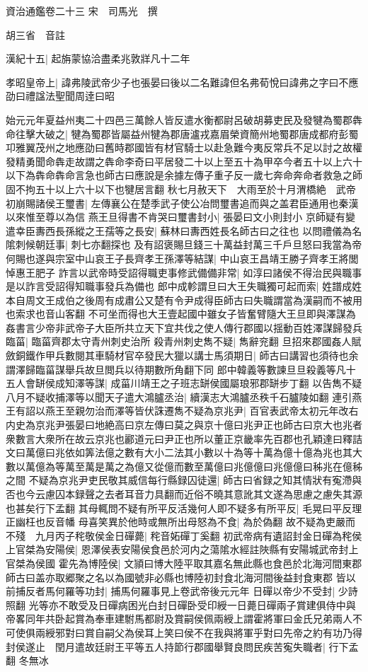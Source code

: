 資治通鑑卷二十三
宋　司馬光　撰

胡三省　音註

漢紀十五|{
	起旃蒙協洽盡柔兆敦牂凡十二年}


孝昭皇帝上|{
	諱弗陵武帝少子也張晏曰後以二名難諱但名弗荀悅曰諱弗之字曰不應劭曰禮諡法聖聞周逹曰昭}


始元元年夏益州夷二十四邑三萬餘人皆反遣水衡都尉呂破胡募吏民及發犍為蜀郡犇命往擊大破之|{
	犍為蜀郡皆屬益州犍為郡唐瀘戎嘉眉榮資簡州地蜀郡唐成都府彭蜀卭雅翼茂州之地應劭曰舊時郡國皆有材官騎士以赴急難今夷反常兵不足以討之故權發精勇聞命犇走故謂之犇命李奇曰平居發二十以上至五十為甲卒今者五十以上六十以下為犇命犇命言急也師古曰應說是余據左傳子重子反一歲七奔命奔命者救急之師固不拘五十以上六十以下也犍居言翻}
秋七月赦天下　大雨至於十月渭橋絶　武帝初崩賜諸侯王璽書|{
	左傳襄公在楚季武子使公冶問璽書追而與之盖君臣通用也秦漢以來惟至尊以為信}
燕王旦得書不肯哭曰璽書封小|{
	張晏曰文小則封小}
京師疑有變遣幸臣夀西長孫縱之王孺等之長安|{
	蘇林曰夀西姓長名師古曰之往也}
以問禮儀為名隂刺候朝廷事|{
	刺七亦翻探也}
及有詔褒賜旦錢三十萬益封萬三千戶旦怒曰我當為帝何賜也遂與宗室中山哀王子長齊孝王孫澤等結謀|{
	中山哀王昌靖王勝子齊孝王將閭悼惠王肥子}
詐言以武帝時受詔得職吏事修武備備非常|{
	如淳曰諸侯不得治民與職事是以詐言受詔得知職事發兵為備也}
郎中成軫謂旦曰大王失職獨可起而索|{
	姓譜成姓本自周文王成伯之後周有成肅公又楚有令尹成得臣師古曰失職謂當為漢嗣而不被用也索求也音山客翻}
不可坐而得也大王壹起國中雖女子皆奮臂隨大王旦即與澤謀為姦書言少帝非武帝子大臣所共立天下宜共伐之使人傳行郡國以揺動百姓澤謀歸發兵臨菑|{
	臨菑齊郡太守青州刺史治所}
殺青州刺史雋不疑|{
	雋辭兖翻}
旦招來郡國姦人賦斂銅鐵作甲兵數閱其車騎材官卒發民大獵以講士馬須期日|{
	師古曰講習也須待也余謂澤歸臨菑謀舉兵故旦閲兵以待期數所角翻下同}
郎中韓義等數諫旦旦殺義等凡十五人會缾侯成知澤等謀|{
	成菑川靖王之子班志缾侯國屬琅邪郡缾步丁翻}
以告雋不疑八月不疑收捕澤等以聞天子遣大鴻臚丞治|{
	續漢志大鴻臚丞秩千石臚陵如翻}
連引燕王有詔以燕王至親勿治而澤等皆伏誅遷雋不疑為京兆尹|{
	百官表武帝太初元年改右内史為京兆尹張晏曰地絶高曰京左傳曰莫之與京十億曰兆尹正也師古曰京大也兆者衆數言大衆所在故云京兆也酈道元曰尹正也所以董正京畿率先百郡也孔穎達曰釋詰文曰萬億曰兆依如筭法億之數有大小二法其小數以十為等十萬為億十億為兆也其大數以萬億為等萬至萬是萬之為億又從億而數至萬億曰兆億億曰兆億億曰秭兆在億秭之間}
不疑為京兆尹吏民敬其威信每行縣録囚徒還|{
	師古曰省録之知其情狀有寃滯與否也今云慮囚本録聲之去者耳音力具翻而近俗不曉其意訛其文遂為思慮之慮失其源也甚矣行下孟翻}
其母輒問不疑有所平反活幾何人即不疑多有所平反|{
	毛晃曰平反理正幽枉也反音幡}
母喜笑異於他時或無所出母怒為不食|{
	為於偽翻}
故不疑為吏嚴而不殘　九月丙子秺敬侯金日磾薨|{
	秺音妬磾丁奚翻}
初武帝病有遺詔封金日磾為秺侯上官桀為安陽侯|{
	恩澤侯表安陽侯食邑於河内之蕩隂水經註陜縣有安陽城武帝封上官桀為侯國}
霍先為博陸侯|{
	文頴曰博大陸平取其嘉名無此縣也食邑於北海河間東郡師古曰盖亦取郷聚之名以為國號非必縣也博陸初封食北海河間後益封食東郡}
皆以前捕反者馬何羅等功封|{
	捕馬何羅事見上卷武帝後元元年}
日磾以帝少不受封|{
	少詩照翻}
光等亦不敢受及日磾病困光白封日磾卧受印綬一日薨日磾兩子賞建俱侍中與帝畧同年共卧起賞為奉車建駙馬都尉及賞嗣侯佩兩綬上謂霍將軍曰金氏兄弟兩人不可使俱兩綬邪對曰賞自嗣父為侯耳上笑曰侯不在我與將軍乎對曰先帝之約有功乃得封侯遂止　閏月遣故廷尉王平等五人持節行郡國舉賢良問民疾苦寃失職者|{
	行下孟翻}
冬無冰

